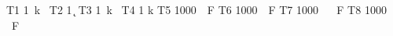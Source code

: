 \documentclass{article}
\begin{document}
T1 \SI{1}{k\Omega} \n
T2 \SI{1}{\k\Omega} \n
T3 \si{1 k\Omega} \n
T4 \SI{1 k}{\Omega} \n
T5 \si{1000 \mu F} \n
T6 \SI{1000}{\mu F} \n
T7 \SI{1000}{\mu\,F} \n
T8 \si{1000 \mu\,F} \n
\end{document}
